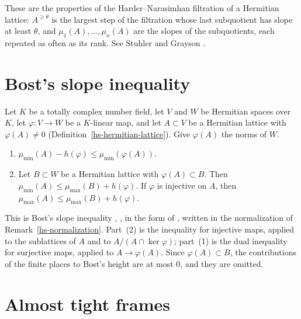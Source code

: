 These are the properties of the Harder--Narasimhan filtration of a Hermitian lattice:
$A^{\geq\theta}$ is the largest step of the filtration whose last subquotient has slope at least
$\theta$, and $\mu_1(A),\ldots,\mu_n(A)$ are the slopes of the subquotients, each repeated as
often as its rank. See Stuhler \cite{Stu76,Stu77} and Grayson \cite{Gra84}.

\section{Bost's slope inequality}\label{section-hs-bost}

\begin{theorem}\label{hs-bost-slope-inequality}
Let $K$ be a totally complex number field, let $V$ and $W$ be Hermitian spaces over $K$, let
$\varphi:V\to W$ be a $K$-linear map, and let $A\subset V$ be a Hermitian lattice with
$\varphi(A)\neq0$ (Definition~\ref{hs-hermitian-lattice}). Give $\varphi(A)$ the norms of $W$.
\begin{enumerate}
\item $\mu_{\min}(A)-h(\varphi)\leq\mu_{\min}(\varphi(A))$.
\item Let $B\subset W$ be a Hermitian lattice with $\varphi(A)\subset B$. Then
  $\mu_{\min}(A)\leq\mu_{\max}(B)+h(\varphi)$. If $\varphi$ is injective on $A$, then
  $\mu_{\max}(A)\leq\mu_{\max}(B)+h(\varphi)$.
\end{enumerate}
\end{theorem}

This is Bost's slope inequality \cite{Bos96}, \cite[Proposition~4.5]{Bos01}, in the form of
\cite[Proposition~1.4.1]{Bos20}, written in the normalization of Remark~\ref{hs-normalization}.
Part~(2) is the inequality for injective maps, applied to the sublattices of $A$ and to
$A/(A\cap\ker\varphi)$; part~(1) is the dual inequality for surjective maps, applied to
$A\to\varphi(A)$. Since $\varphi(A)\subset B$, the contributions of the finite places to Bost's
height are at most $0$, and they are omitted.

\section{Almost tight frames}\label{section-hs-frames}

